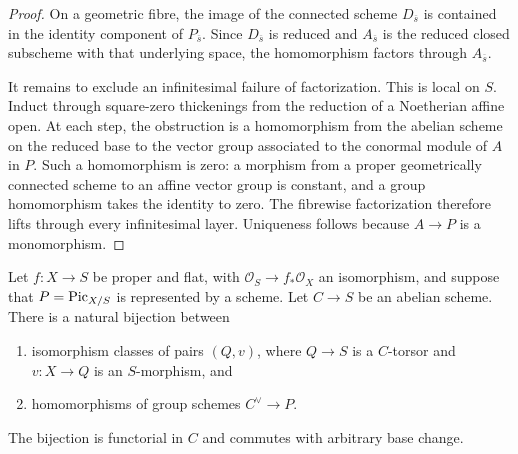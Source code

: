 \begin{proof}
On a geometric fibre, the image of the connected scheme $D_{\overline{s}}$
is contained in the identity component of $P_{\overline{s}}$. Since
$D_{\overline{s}}$ is reduced and $A_{\overline{s}}$ is the reduced closed
subscheme with that underlying space, the homomorphism factors through
$A_{\overline{s}}$.

It remains to exclude an infinitesimal failure of factorization. This is local
on $S$. Induct through square-zero thickenings from the reduction of a
Noetherian affine open. At each step, the obstruction is a homomorphism from
the abelian scheme on the reduced base to the vector group associated to the
conormal module of $A$ in $P$. Such a homomorphism is zero: a morphism from a
proper geometrically connected scheme to an affine vector group is constant,
and a group homomorphism takes the identity to zero. The fibrewise
factorization therefore lifts through every infinitesimal layer. Uniqueness
follows because $A \to P$ is a monomorphism.
\end{proof}

\begin{proposition}
\label{proposition-maps-to-abelian-torsors}
Let $f : X \to S$ be proper and flat, with
$\mathcal{O}_S \to f_*\mathcal{O}_X$ an isomorphism, and suppose that
$P = \mathrm{Pic}_{X/S}$ is represented by a scheme. Let $C \to S$ be an
abelian scheme. There is a natural bijection between
\begin{enumerate}
\item isomorphism classes of pairs $(Q, v)$, where $Q \to S$ is a
$C$-torsor and $v : X \to Q$ is an $S$-morphism, and
\item homomorphisms of group schemes $C^\vee \to P$.
\end{enumerate}
The bijection is functorial in $C$ and commutes with arbitrary base change.
\end{proposition}

